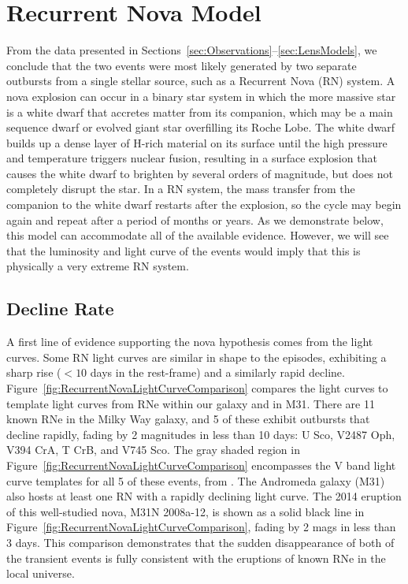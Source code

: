 \section{Recurrent Nova Model}
\label{sec:RecurrentNovaModel}

From the data presented in
Sections~\ref{sec:Observations}--\ref{sec:LensModels}, we conclude
that the two \spock events were most likely generated by two separate
outbursts from a single stellar source, such as a Recurrent Nova (RN)
system. A nova explosion can occur in a binary star system in which
the more massive star is a white dwarf that accretes matter from its
companion, which may be a main sequence dwarf or evolved giant star
overfilling its Roche Lobe. The white dwarf builds up a dense layer of
H-rich material on its surface until the high pressure and temperature
triggers nuclear fusion, resulting in a surface explosion
that causes the white dwarf to brighten by several orders of
magnitude, but does not completely disrupt the star. In a RN system,
the mass transfer from the companion to the white dwarf restarts after
the explosion, so the cycle may begin again and repeat after a period
of months or years.  As we demonstrate below, this model can
accommodate all of the available evidence.  However, we will see that
the luminosity and light curve of the \spock events would imply that
this is physically a very extreme RN system.

\subsection{Decline Rate}

A first line of evidence supporting the nova hypothesis comes from the
\spock light curves. Some RN light curves are similar in shape to the
\spock episodes, exhibiting a sharp rise ($<10$ days in the
rest-frame) and a similarly rapid decline.
Figure~\ref{fig:RecurrentNovaLightCurveComparison} compares the \spock
light curves to template light curves from RNe within our galaxy and
in M31.  There are 11 known RNe in the Milky Way galaxy, and 5 of
these exhibit outbursts that decline rapidly, fading by 2 magnitudes
in less than 10 days: U Sco, V2487 Oph, V394 CrA, T CrB, and V745 Sco.
The gray shaded region in
Figure~\ref{fig:RecurrentNovaLightCurveComparison} encompasses the V
band light curve templates for all 5 of these events, from
\citet{Schaefer:2010}.  The Andromeda galaxy (M31) also hosts at least
one RN with a rapidly declining light curve.  The 2014 eruption of
this well-studied nova, M31N 2008a-12, is shown as a solid black line
in Figure~\ref{fig:RecurrentNovaLightCurveComparison}, fading by 2
mags in less than 3 days.  This comparison demonstrates that the
sudden disappearance of both of the \spock transient events is fully
consistent with the eruptions of known RNe in the local universe.

